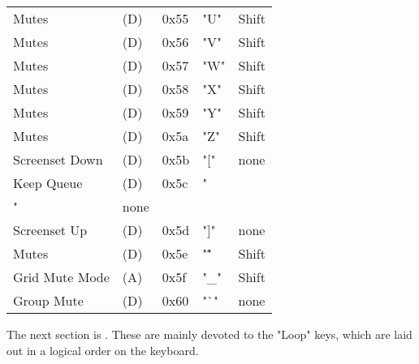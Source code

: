 \begin{table}[htb!]
\begin{tabular}{l l l l l}
        Mutes              & (D)  &  0x55   & "U"          & Shift \\
        Mutes              & (D)  &  0x56   & "V"          & Shift \\
        Mutes              & (D)  &  0x57   & "W"          & Shift \\
        Mutes              & (D)  &  0x58   & "X"          & Shift \\
        Mutes              & (D)  &  0x59   & "Y"          & Shift \\
        Mutes              & (D)  &  0x5a   & "Z"          & Shift \\
        Screenset Down     & (D)  &  0x5b   & "["          & none \\
        Keep Queue         & (D)  &  0x5c   & "\\"         & none \\
        Screenset Up       & (D)  &  0x5d   & "]"          & none \\
        Mutes              & (D)  &  0x5e   & "\^"         & Shift \\
        Grid Mute Mode     & (A)  &  0x5f   & "\_"         & Shift \\
        Group Mute         & (D)  &  0x60   & "`"          & none \\
      \end{tabular}
   \end{table}

   The next section is .
   These are mainly devoted to the "Loop" keys, which are laid out in
   a logical order on the keyboard.

